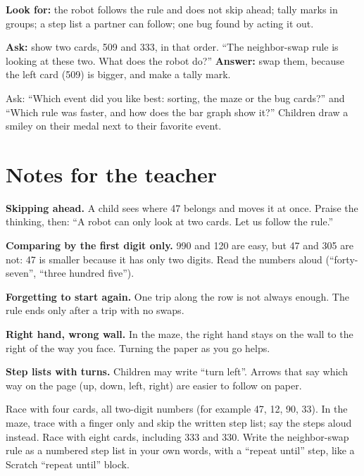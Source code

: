 \begin{formativecheck}
\textbf{Look for:} the robot follows the rule and does not skip ahead; tally marks in groups; a step list a partner can follow; one bug found by acting it out.

\textbf{Ask:} show two cards, 509 and 333, in that order. \enquote{The neighbor-swap rule is looking at these two. What does the robot do?}
\textbf{Answer:} swap them, because the left card (509) is bigger, and make a tally mark.
\end{formativecheck}

\begin{reflection}
Ask: \enquote{Which event did you like best: sorting, the maze or the bug cards?} and \enquote{Which rule was faster, and how does the bar graph show it?} Children draw a smiley on their medal next to their favorite event.
\end{reflection}

\section{Notes for the teacher}
\begin{commonmistakes}
  \item \textbf{Skipping ahead.} A child sees where 47 belongs and moves it at once. Praise the thinking, then: \enquote{A robot can only look at two cards. Let us follow the rule.}
  \item \textbf{Comparing by the first digit only.} 990 and 120 are easy, but 47 and 305 are not: 47 is smaller because it has only two digits. Read the numbers aloud (\enquote{forty-seven}, \enquote{three hundred five}).
  \item \textbf{Forgetting to start again.} One trip along the row is not always enough. The rule ends only after a trip with no swaps.
  \item \textbf{Right hand, wrong wall.} In the maze, the right hand stays on the wall to the right of the way you face. Turning the paper as you go helps.
  \item \textbf{Step lists with turns.} Children may write \enquote{turn left}. Arrows that say which way on the page (up, down, left, right) are easier to follow on paper.
\end{commonmistakes}

\begin{differentiation}
\supportpath Race with four cards, all two-digit numbers (for example 47, 12, 90, 33). In the maze, trace with a finger only and skip the written step list; say the steps aloud instead.
\extensionpath Race with eight cards, including 333 and 330. Write the neighbor-swap rule as a numbered step list in your own words, with a \enquote{repeat until} step, like a Scratch \enquote{repeat until} block.
\end{differentiation}

